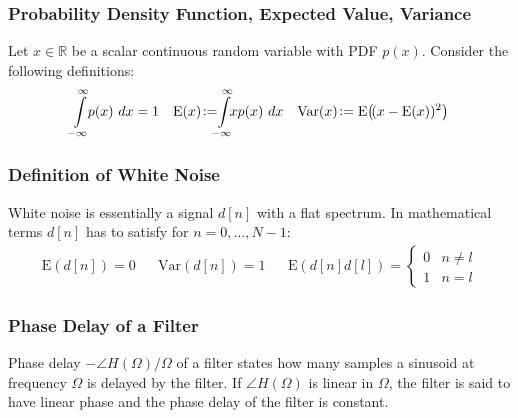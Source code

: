 \subsubsection{Probability Density Function, Expected Value, Variance}
Let $x\in\mathbb{R}$ be a scalar continuous random variable with PDF $p(x)$. Consider the following definitions:
$$
\int\limits_{-\infty}^\infty \!\!p(x) \ d x = 1  \quad \mathrm{E}(x)\! \vcentcolon=\!\!\! \int\limits_{-\infty}^\infty\!\!\! xp(x)\ d x  \quad \mathrm{Var}(x)\!\vcentcolon= \mathrm{E}\!\left(\!(x-\mathrm{E}(x))^2 \right)
$$
\vfill \null \columnbreak
\subsubsection{Definition of White Noise}
White noise is essentially a signal $d[n]$ with a flat spectrum. In mathematical terms $d[n]$ has to satisfy for $n = 0, \hdots, N-1$:
\begin{align*}
	\mathrm{E}(d[n]) = 0 && \mathrm{Var}(d[n]) = 1 && \mathrm{E}(d[n] d[l]) = \begin{cases}0 & n\neq l \\ 1 & n = l\end{cases}
\end{align*}

\subsubsection{Phase Delay of a Filter}
Phase delay $-\angle H(\Omega)/\Omega$ of a filter states how many samples a sinusoid at frequency $\Omega$ is delayed by the filter. If $\angle H(\Omega)$ is linear in $\Omega$, the filter is said to have linear phase and the phase delay of the filter is constant.
